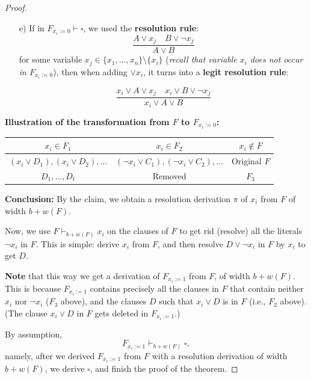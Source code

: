 \begin{proof}
\textbf{ }

\begin{enumerate}
    \item[e)] If in $F_{x_i := 0} \vdash \square$, we used the \textbf{resolution rule}:
    \[
    \frac{A \lor x_j \quad B \lor \neg x_j}{A \lor B}
    \]
    for some variable $x_j \in \{x_1, \dots, x_n\} \setminus \{x_i\}$  
    (\textit{recall that variable $x_i$ does not occur in $F_{x_i := 0}$}),  
    then when adding $\lor x_i$, it turns into a \textbf{legit resolution rule}:

    \[
    \frac{x_i \lor A \lor x_j \quad x_i \lor B \lor \neg x_j}{x_i \lor A \lor B}
    \]
\end{enumerate}

\textbf{Illustration of the transformation from $F$ to $F_{x_i := 0}$:}

\begin{center}
    \begin{tabular}{|c|c|c|}
        \hline
        $x_i \in F_1$ & $x_i \in F_2$ & $x_i \notin F$ \\
        \hline
        $(x_i \lor D_1), (x_i \lor D_2), \dots$ & $(\neg x_i \lor C_1), (\neg x_i \lor C_2), \dots$ & Original $F$ \\
        \hline
        $D_1, \dots, D_t$ & Removed & $F_3$ \\
        \hline
    \end{tabular}
\end{center}

\textbf{Conclusion:}  
By the claim, we obtain a resolution derivation $\pi$ of $x_i$ from $F$  
of width $b + w(F)$.


\textbf{ }

Now, we use $F \vdash_{b + w(F)} x_i$ on the clauses of $F$ to get rid (resolve)  
all the literals $\neg x_i$ in $F$.  
This is simple: derive $x_i$ from $F$, and then resolve $D \lor \neg x_i$ in $F$  
by $x_i$ to get $D$.

\textbf{Note} that this way we get a derivation of $F_{x_i := 1}$ from $F$, of width $b + w(F)$.  
This is because $F_{x_i := 1}$ contains precisely all the clauses in $F$ that  
contain neither $x_i$ nor $\neg x_i$ ($F_3$ above), and the clauses $D$  
such that $x_i \lor D$ is in $F$ (i.e., $F_2$ above).  
(The clause $x_i \lor D$ in $F$ gets deleted in $F_{x_i := 1}$.)

By assumption,  
\[
F_{x_i := 1} \vdash_{b + w(F)} \square,
\]
namely, after we derived $F_{x_i := 1}$ from $F$ with a resolution derivation of width $b + w(F)$,  
we derive $\square$, and finish the proof of the theorem.





\mbox{}
\end{proof}

